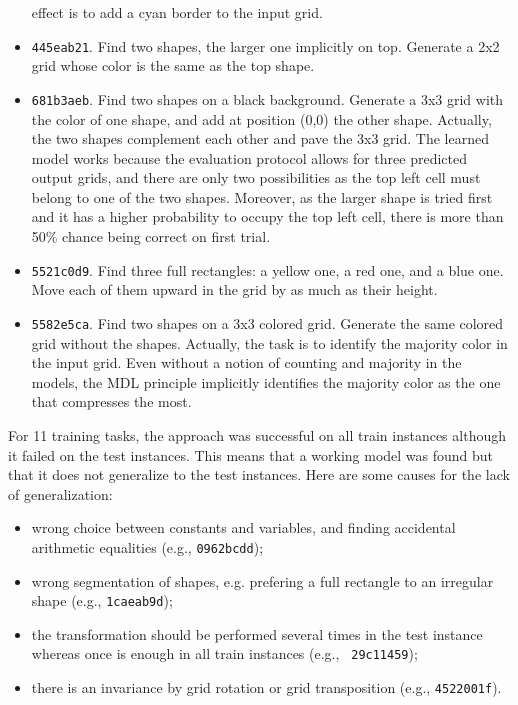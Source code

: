 \documentclass[a4paper]{llncs}
\newcommand{\HIDE}[1]{}
\begin{document}
\begin{itemize}
  effect is to add a cyan border to the input grid.
\item {\tt 445eab21}. Find two shapes, the larger one implicitly on
  top. Generate a 2x2 grid whose color is the same as the top shape.
\item {\tt 681b3aeb}. Find two shapes on a black background. Generate
  a 3x3 grid with the color of one shape, and add at position (0,0)
  the other shape. Actually, the two shapes complement each other and
  pave the 3x3 grid. The learned model works because the evaluation
  protocol allows for three predicted output grids, and there are only
  two possibilities as the top left cell must belong to one of the two
  shapes. Moreover, as the larger shape is tried first and it has a
  higher probability to occupy the top left cell, there is more than
  50\% chance being correct on first trial.
\item {\tt 5521c0d9}. Find three full rectangles: a yellow one, a red
  one, and a blue one. Move each of them upward in the grid by as much
  as their height.
\item {\tt 5582e5ca}. Find two shapes on a 3x3 colored grid. Generate
  the same colored grid without the shapes. Actually, the task is to
  identify the majority color in the input grid. Even without a notion
  of counting and majority in the models, the MDL principle implicitly
  identifies the majority color as the one that compresses the most.
\end{itemize}
\HIDE{
  \item {\tt 05269061}. Find three shapes, and generate a three-color
  checker boards as a combination of three shapes with complex
  masks. One color is handled by the background color. Another color
  is handled by the top shape whose mask is a set of stripes. The last
  color is handled by the two bottom shapes, although a single one
  should be sufficient. The three input shapes are three stripes
  picked at random, one for each color. The learned model cannot
  predict for sure which color is where, so that it often fails on
  first trial. This task can actually not be genuinely understood by
  Version~2 models but interestingly, it could nonetheless be solved
  to some extent.}

For 11 training tasks, the approach was successful on all train
instances although it failed on the test instances. This means that a
working model was found but that it does not generalize to the test
instances. Here are some causes for the lack of generalization:
\begin{itemize}
\item wrong choice between constants and variables, and finding
  accidental arithmetic equalities (e.g., {\tt 0962bcdd});
\item wrong segmentation of shapes, e.g. prefering a full rectangle to
  an irregular shape (e.g., {\tt 1caeab9d});
\item the transformation should be performed several times in the test
  instance whereas once is enough in all train instances (e.g., {\tt
    29c11459});
\item there is an invariance by grid rotation or grid transposition
  (e.g., {\tt 4522001f}).
\end{itemize}
\end{document}
